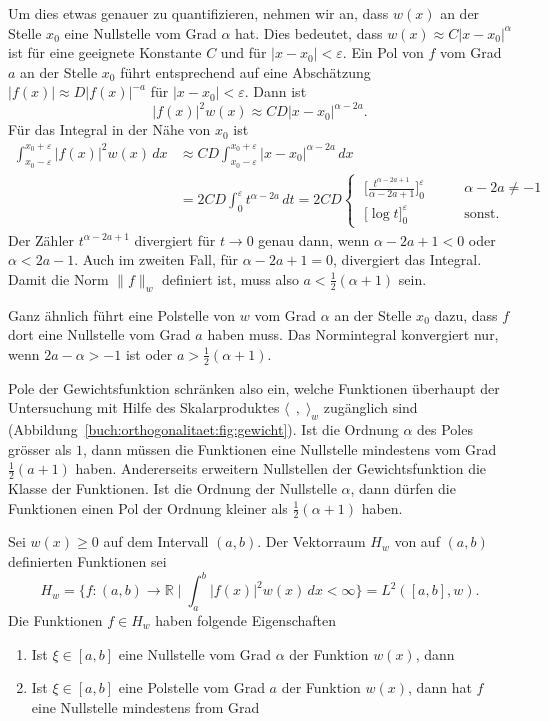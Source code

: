 Um dies etwas genauer zu quantifizieren, nehmen wir an, dass
$w(x)$ an der Stelle $x_0$ eine Nullstelle vom Grad $\alpha$ hat.
Dies bedeutet, dass $w(x) \approx C|x-x_0|^\alpha$ ist für eine geeignete
Konstante $C$ und für $|x-x_0|<\varepsilon$.
Ein Pol von $f$ vom Grad $a$ an der Stelle $x_0$ führt entsprechend auf
eine Abschätzung $|f(x)| \approx D|f(x)|^{-a}$ für $|x-x_0|<\varepsilon$.
Dann ist
\[
|f(x)|^2 w(x) \approx CD |x-x_0|^{\alpha-2a}.
\]
Für das Integral in der Nähe von $x_0$ ist
\begin{align*}
\int_{x_0-\varepsilon}^{x_0+\varepsilon}
|f(x)|^2 w(x)\,dx
&\approx 
CD
\int_{x_0-\varepsilon}^{x_0+\varepsilon}
|x-x_0|^{\alpha-2a}\,dx
\\
&=
2CD
\int_0^\varepsilon
t^{\alpha-2a}
\,dt
=
2CD
\begin{cases}
\displaystyle
\;
\biggl[\frac{t^{\alpha-2a+1}}{\alpha-2a+1}\biggr]_0^\varepsilon
&\qquad
\alpha-2a\ne-1
\\[7pt]
\displaystyle
\;
\biggl[ \log t \biggr]_0^\varepsilon
&\qquad
\text{sonst.}
\end{cases}
\end{align*}
Der Zähler $t^{\alpha-2a+1}$ divergiert für $t\to 0$ genau dann,
wenn $\alpha-2a+1<0$ oder $\alpha<2a-1$.
Auch im zweiten Fall, für $\alpha-2a+1=0$, divergiert das Integral.
Damit die Norm $\|f\|_w$ definiert ist, muss also $a<\frac12(\alpha+1)$
sein.

Ganz ähnlich führt eine Polstelle von $w$ vom Grad $\alpha$
an der Stelle $x_0$ dazu, dass $f$ dort eine Nullstelle vom Grad
$a$ haben muss.
Das Normintegral konvergiert nur, wenn $2a-\alpha > -1$ ist
oder $a > \frac12(\alpha+1)$.
 
Pole der Gewichtsfunktion schränken also ein, welche Funktionen
überhaupt der Untersuchung mit Hilfe des Skalarproduktes
$\langle\,\;,\;\rangle_w$ zugänglich sind
(Abbildung~\ref{buch:orthogonalitaet:fig:gewicht}).
Ist die Ordnung $\alpha$ des Poles grösser als $1$, dann müssen die Funktionen
eine Nullstelle mindestens vom Grad $\frac12(a+1)$ haben.
Andererseits erweitern
Nullstellen der Gewichtsfunktion die Klasse der Funktionen.
Ist die Ordnung der Nullstelle $\alpha$, dann dürfen die Funktionen einen
Pol der Ordnung kleiner als $\frac12(\alpha+1)$ haben.

\begin{lemma}
\label{buch:orthogonal:lemma:gewichtsfunktion}
Sei $w(x)\ge 0$ auf dem Intervall $(a,b)$.
Der Vektorraum $H_w$ von auf $(a,b)$ definierten Funktionen sei
\[
H_w
=
\biggl\{
f\colon(a,b) \to \mathbb{R}
\;\bigg|\;
\int_a^b |f(x)|^2 w(x)\,dx
<\infty
\biggr\}
=
L^2([a,b],w).
\]
%
Die Funktionen $f\in H_w$ haben folgende Eigenschaften
\begin{enumerate}
\item
Ist $\xi\in[a,b]$ eine Nullstelle vom Grad $\alpha$ der Funktion $w(x)$,
dann 
\item
Ist $\xi\in[a,b]$ eine Polstelle vom Grad $a$ der Funktion $w(x)$,
dann hat $f$ eine Nullstelle mindestens from Grad 
\end{enumerate}
\end{lemma}


